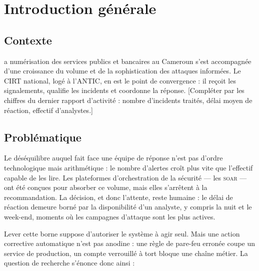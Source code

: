\let\textcircled=\pgftextcircled
\chapter*{Introduction g\'en\'erale}
\label{chap:intro}

\section*{Contexte}
a num\'erisation des services publics et bancaires au Cameroun s'est
accompagn\'ee d'une croissance du volume et de la sophistication des attaques
inform\'ees. Le CIRT national, log\'e \`a l'ANTIC, en est le point de convergence : il
re\c coit les signalements, qualifie les incidents et coordonne la r\'eponse.
[Compl\'eter par les chiffres du dernier rapport d'activit\'e : nombre d'incidents
trait\'es, d\'elai moyen de r\'eaction, effectif d'analystes.]

\section*{Probl\'ematique}
Le d\'es\'equilibre auquel fait face une \'equipe de r\'eponse n'est pas
d'ordre technologique mais arithm\'etique : le nombre d'alertes cro\^it plus vite que
l'effectif capable de les lire. Les plateformes d'orchestration de la s\'ecurit\'e
--- les \textsc{soar} --- ont \'et\'e con\c cues pour absorber ce volume, mais elles
s'arr\^etent \`a la recommandation. La d\'ecision, et donc l'attente, reste humaine : le
d\'elai de r\'eaction demeure born\'e par la disponibilit\'e d'un analyste, y compris la
nuit et le week-end, moments o\`u les campagnes d'attaque sont les plus actives.

Lever cette borne suppose d'autoriser le syst\`eme \`a agir seul. Mais une action
corrective automatique n'est pas anodine : une r\`egle de pare-feu erron\'ee coupe un
service de production, un compte verrouill\'e \`a tort bloque une cha\^ine m\'etier. La
question de recherche s'\'enonce donc ainsi :

